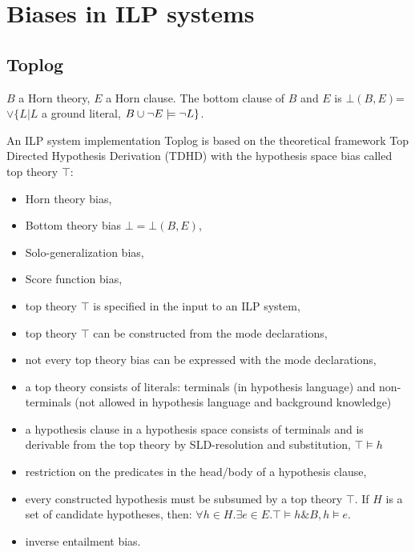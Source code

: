 \section{Biases in ILP systems}

\iffalse
\subsection{Progol}
\begin{itemize}
\item Inverse Entailment,
\item a bias provided by mode declaration,
\end{itemize}
\fi

\subsection{Toplog\cite{muggleton2008toplog}}
\begin{defn}
$B$ a Horn theory, $E$ a Horn clause. The bottom clause of $B$ and $E$ is $\bot(B,E)$=$\vee\{L | L $ a ground literal, $B \cup {\neg E} \models \neg L\}$.
\end{defn}
An ILP system implementation Toplog is based on the theoretical framework Top Directed Hypothesis Derivation (TDHD) with the hypothesis space bias called top theory $\top$:
\begin{itemize}
\item Horn theory bias,
\item Bottom theory bias $\bot = \bot(B,E)$,
\item Solo-generalization bias,
\item Score function bias,
\item top theory $\top$ is specified in the input to an ILP system,
\item top theory $\top$ can be constructed from the mode declarations,
\item not every top theory bias can be expressed with the mode declarations,
\item a top theory consists of literals: terminals (in hypothesis language) and non-terminals (not allowed in hypothesis language and background knowledge)
\item a hypothesis clause in a hypothesis space consists of terminals and is derivable from the top theory by SLD-resolution and substitution, $\top \models h$
\item restriction on the predicates in the head/body of a hypothesis clause,
\item every constructed hypothesis must be subsumed by a top theory $\top$. If $H$ is a set of candidate hypotheses, then: $\forall h \in H. \exists e \in E. \top \models h \& B, h \models e$.
\item inverse entailment bias.
\end{itemize}
